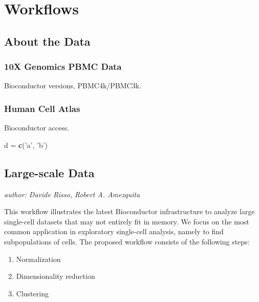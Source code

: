\documentclass[]{book}
\newenvironment{Shaded}{\begin{snugshade}}{\end{snugshade}}
\newcommand{\KeywordTok}[1]{\textcolor[rgb]{0.13,0.29,0.53}{\textbf{#1}}}
\newcommand{\NormalTok}[1]{#1}
\newcommand{\StringTok}[1]{\textcolor[rgb]{0.31,0.60,0.02}{#1}}
\providecommand{\tightlist}{%
  \setlength{\itemsep}{0pt}\setlength{\parskip}{0pt}}
\begin{document}
\hypertarget{part-workflows}{%
\part{Workflows}\label{part-workflows}}

\hypertarget{about-the-data}{%
\chapter{About the Data}\label{about-the-data}}

\hypertarget{x-genomics-pbmc-data}{%
\section{10X Genomics PBMC Data}\label{x-genomics-pbmc-data}}

Bioconductor versions, PBMC4k/PBMC3k.

\hypertarget{human-cell-atlas}{%
\section{Human Cell Atlas}\label{human-cell-atlas}}

Bioconductor access.

\begin{Shaded}
\begin{Highlighting}[]
\NormalTok{d =}\StringTok{ }\KeywordTok{c}\NormalTok{(}\StringTok{'a'}\NormalTok{, }\StringTok{'b'}\NormalTok{)}
\end{Highlighting}
\end{Shaded}

\hypertarget{large-scale-data}{%
\chapter{Large-scale Data}\label{large-scale-data}}

\emph{author: Davide Risso, Robert A. Amezquita}

This workflow illustrates the latest Bioconductor infrastructure to analyze large single-cell datasets that may not entirely fit in memory. We focus on the most common application in exploratory single-cell analysis, namely to find subpopulations of cells. The proposed workflow consists of the following steps:

\begin{enumerate}
\def\labelenumi{\arabic{enumi}.}
\tightlist
\item
  Normalization
\item
  Dimensionality reduction
\item
  Clustering
\end{enumerate}
\end{document}
